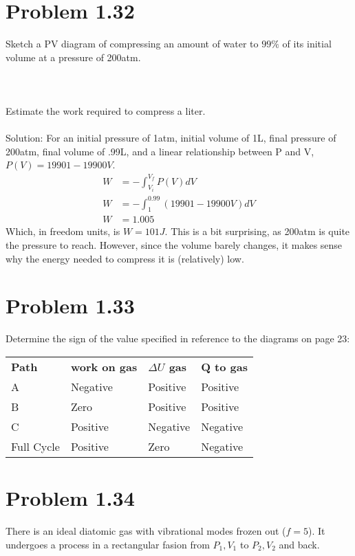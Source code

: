 \documentclass[paper=a4, fontsize=11pt]{scrartcl} %
\numberwithin{equation}{section} %
\numberwithin{figure}{section} %
\numberwithin{table}{section} %
\begin{document}
\section*{Problem 1.32}
Sketch a PV diagram of compressing an amount of water to $99\%$ of its initial volume at a
pressure of 200atm.
\\
\\
\\
\\
Estimate the work required to compress a liter.
\\
\\
Solution:
For an initial pressure of 1atm, initial volume of 1L, final pressure of 200atm, final volume
of .99L, and a linear relationship between P and V, $P(V)=19901 -19900V$.
\[
\begin{aligned}
W &= -\int_{V_i}^{V_f} P(V)dV\\
W &= -\int_1^{0.99} (19901 -19900V)dV\\
W &= 1.005
\end{aligned}
\]
Which, in freedom units, is $W=101J$.
This is a bit surprising, as 200atm is quite the pressure to reach. However, since the
volume barely changes, it makes sense why the energy needed to compress it is (relatively) low.

\section*{Problem 1.33}
Determine the sign of the value specified in reference to the diagrams on page 23:
\\
\begin{tabular}{l | l | l | l}
\textbf{Path} & \textbf{work on gas} & \textbf{$\Delta U$ gas} & \textbf{Q to gas}\\
        A        & Negative     & Positive      & Positive \\
        B        & Zero         & Positive      & Positive \\
        C        & Positive     & Negative      & Negative \\
    Full Cycle   & Positive     & Zero          & Negative
\end{tabular}

\section*{Problem 1.34}
There is an ideal diatomic gas with vibrational modes frozen out ($f=5$). It undergoes
a process in a rectangular fasion from $P_1, V_1$ to $P_2,V_2$ and back.
\end{document}
